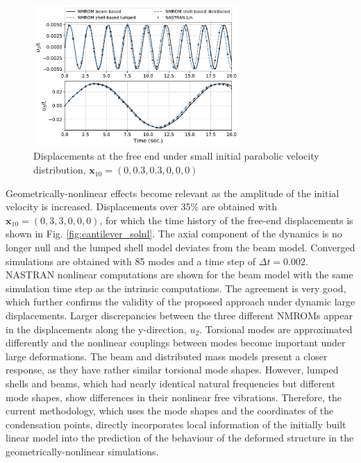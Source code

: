 \documentclass[11pt]{article}
\begin{document}
\begin{figure}[h!]
\centering
\includegraphics[width=0.7\textwidth]{./img/cantilever_sollin3}
\caption{Displacements at the free end under small initial parabolic velocity distribution, $\pmb{x}_{10} = (0,0.3,0.3,0,0,0)$}\label{fig:cantilever_sollin}
\end{figure}
Geometrically-nonlinear effects become relevant as the amplitude of the initial velocity is increased. Displacements over 35$\%$ are obtained with $\pmb{x}_{10} = (0,3,3,0,0,0)$, for which the time history of the free-end displacements is shown in Fig. \ref{fig:cantilever_solnl}. The axial component of the dynamics is no longer null and the lumped shell model deviates from the beam model. Converged simulations are obtained with 85 modes and a time step of $\Delta t = 0.002$. NASTRAN nonlinear computations are shown for the beam model with the same simulation time step as the intrinsic computations. The agreement is very good, which further confirms the validity of the proposed approach under dynamic large displacements. Larger discrepancies between the three different NMROMs appear in the displacements along the y-direction, $u_2$. Torsional modes are approximated differently and the nonlinear couplings between modes become important under large deformations. The beam and distributed mass models present a closer response, as they have rather similar torsional mode shapes. However, lumped shells and beams, which had  nearly identical natural frequencies but different mode shapes, show differences in their nonlinear free vibrations. Therefore, the current methodology, which uses the mode shapes and the coordinates of the condensation points, directly incorporates local information of the initially built linear model into the prediction of the behaviour of the deformed structure in the geometrically-nonlinear simulations.
%
\end{document}
